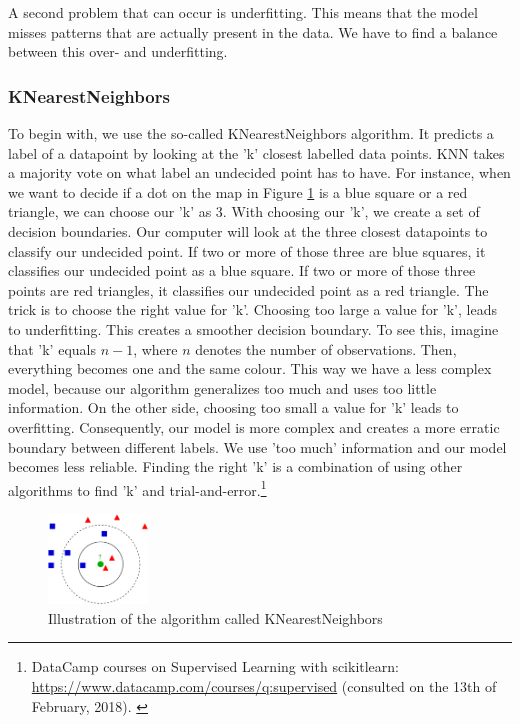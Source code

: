 \documentclass[11pt]{article}
\begin{document}
A second problem that can occur is underfitting. This means that the model misses patterns that are actually present in the data. We have to find a balance between this over- and underfitting. 


\subsubsection{KNearestNeighbors}
\label{sec:orgfcfdf72}

To begin with, we use the so-called KNearestNeighbors algorithm. It predicts a label of a datapoint by looking at the 'k' closest labelled data points. KNN takes a majority vote on what label an undecided point has to have. For instance, when we want to decide if a dot on the map in Figure \ref{tab:knn} is a blue square or a red triangle, we can choose our 'k' as 3. With choosing our 'k', we create a set of decision boundaries. Our computer will look at the three closest datapoints to classify our undecided point. If two or more of those three are blue squares, it classifies our undecided point as a blue square. If two or more of those three points are red triangles, it classifies our undecided point as a red triangle. The trick is to choose the right value for 'k'. Choosing too large a value for 'k', leads to underfitting. This creates a smoother decision boundary. To see this, imagine that 'k' equals \(n-1\), where \(n\) denotes the number of observations. Then, everything becomes one and the same colour. This way we have a less complex model, because our algorithm generalizes too much and uses too little information. On the other side, choosing too small a value for 'k' leads to overfitting. Consequently, our model is more complex and creates a more erratic boundary between different labels. We use 'too much' information and our model becomes less reliable.  Finding the right 'k' is a combination of using other algorithms to find 'k' and trial-and-error.\footnote{DataCamp courses on Supervised Learning with scikitlearn: \url{https://www.datacamp.com/courses/q:supervised} (consulted on the 13th of February, 2018). \label{fn:datacamp}}

\begin{figure}[htbp]
\centering
\includegraphics[width=100px]{./KnnClassification.png}
\caption{\label{tab:knn}
Illustration of the algorithm called KNearestNeighbors}
\end{figure} 
\end{document}

